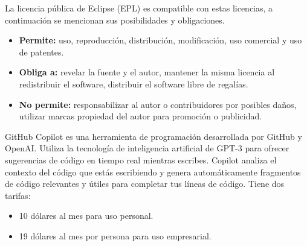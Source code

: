 La licencia pública de Eclipse (EPL) es compatible con estas licencias, a continuación se mencionan sus posibilidades y obligaciones.
\begin{itemize}
	\item\textbf{Permite:} uso, reproducción, distribución, modificación, uso comercial y uso de patentes.
	\item\textbf{Obliga a:} revelar la fuente y el autor, mantener la misma licencia al redistribuir el software, distribuir el software libre de regalías.
	\item\textbf{No permite:} responsabilizar al autor o contribuidores por posibles daños, utilizar marcas propiedad del autor para promoción o publicidad.
\end{itemize}

GitHub Copilot es una herramienta de programación desarrollada por GitHub y OpenAI. Utiliza la tecnología de inteligencia artificial de GPT-3 para ofrecer sugerencias de código en tiempo real mientras escribes. Copilot analiza el contexto del código que estás escribiendo y genera automáticamente fragmentos de código relevantes y útiles para completar tus líneas de código.
Tiene dos tarifas:
\begin{itemize}
	\item 10 dólares al mes para uso personal.
	\item 19 dólares al mes por persona para uso empresarial.
\end{itemize}